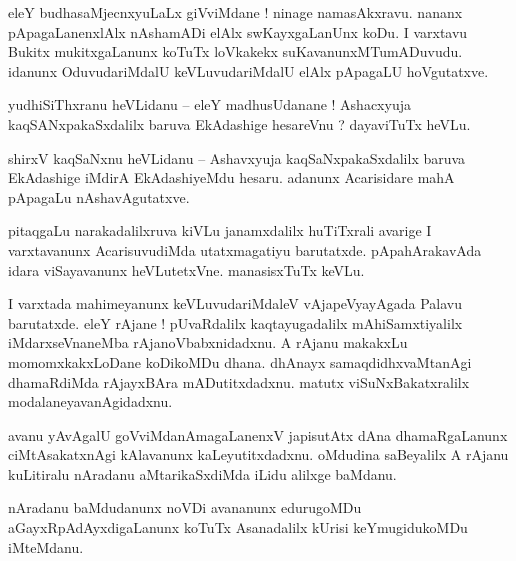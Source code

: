 \documentclass{article}
\begin{document}
\begin{mn}%
eleY budhasaMjecnxyuLaLx giVviMdane ! ninage namasAkxravu. nananx pApagaLanenxlAlx nAshamADi elAlx 
swKayxgaLanUnx koDu. I varxtavu Bukitx mukitxgaLanunx koTuTx loVkakekx suKavanunxMTumADuvudu. 
idanunx OduvudariMdalU keVLuvudariMdalU elAlx pApagaLU hoVgutatxve.
\end{mn}


\begin{mn}%
yudhiSiThxranu heVLidanu -- eleY madhusUdanane ! Ashacxyuja kaqSANxpakaSxdalilx baruva EkAdashige 
hesareVnu ? dayaviTuTx heVLu.
\end{mn}

\begin{mn}%
shirxV kaqSaNxnu heVLidanu -- Ashavxyuja kaqSaNxpakaSxdalilx baruva EkAdashige iMdirA EkAdashiyeMdu 
hesaru. adanunx Acarisidare mahA pApagaLu nAshavAgutatxve.
\end{mn}

\begin{mn}%
pitaqgaLu narakadalilxruva kiVLu janamxdalilx huTiTxrali avarige I varxtavanunx AcarisuvudiMda 
utatxmagatiyu barutatxde. pApahArakavAda idara viSayavanunx heVLutetxVne. manasisxTuTx keVLu.
\end{mn}

\begin{mn}%
I varxtada mahimeyanunx keVLuvudariMdaleV vAjapeVyayAgada Palavu barutatxde. eleY rAjane ! 
pUvaRdalilx kaqtayugadalilx mAhiSamxtiyalilx iMdarxseVnaneMba rAjanoVbabxnidadxnu. A rAjanu 
makakxLu momomxkakxLoDane koDikoMDu dhana. dhAnayx samaqdidhxvaMtanAgi dhamaRdiMda rAjayxBAra 
mADutitxdadxnu. matutx viSuNxBakatxralilx modalaneyavanAgidadxnu.
\end{mn}

\begin{mn}%
avanu yAvAgalU goVviMdanAmagaLanenxV japisutAtx dAna dhamaRgaLanunx ciMtAsakatxnAgi kAlavanunx 
kaLeyutitxdadxnu. oMdudina saBeyalilx A rAjanu kuLitiralu nAradanu aMtarikaSxdiMda iLidu alilxge 
baMdanu.
\end{mn}

\begin{mn}%
nAradanu baMdudanunx noVDi avananunx edurugoMDu aGayxRpAdAyxdigaLanunx koTuTx Asanadalilx kUrisi 
keYmugidukoMDu iMteMdanu.
\end{mn}
\end{document}
